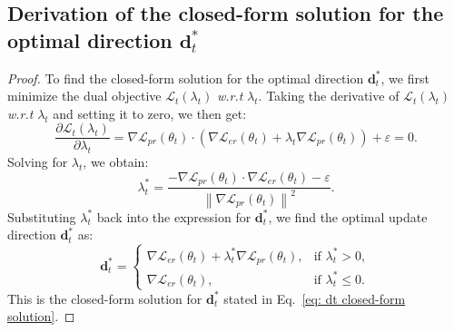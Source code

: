 \subsection{Derivation of the closed-form solution for the optimal direction $\mathbf{d}^*_t$}
\label{appendix: Derivation of the closed-form solution for the optimal direction}
\begin{proof}

To find the closed-form solution for the optimal direction $\mathbf{d}^*_t$, we first minimize the dual objective $\mathcal{L}_{t}(\lambda_t)$ \textit{w.r.t} $\lambda_t$. Taking the derivative of $\mathcal{L}_{t}(\lambda_t)$ \textit{w.r.t} $\lambda_t$ and setting it to zero, we then get:
\begin{equation}
    \label{eq: Taking the derivative of Lt wrt lambda t and setting it to zero}
    \frac{\partial \mathcal{L}_{t}(\lambda_t)}{\partial \lambda_t} = \nabla \mathcal{L}_{pr}(\theta_t) \cdot (\nabla \mathcal{L}_{er}(\theta_t) + \lambda_t \nabla \mathcal{L}_{pr}(\theta_t)) + \varepsilon = 0.
\end{equation}
Solving for $\lambda_t$, we obtain:
\begin{equation}
    \lambda_t^* = \frac{-\nabla \mathcal{L}_{pr}(\theta_t) \cdot \nabla \mathcal{L}_{er}(\theta_t) - \varepsilon}{\left\|\nabla \mathcal{L}_{pr}(\theta_t)\right\|^2}.
\end{equation}
Substituting $\lambda_t^*$ back into the expression for $\mathbf{d}^*_t$, we find the optimal update direction $\mathbf{d}^*_t$ as:
\begin{equation}
    \mathbf{d}^*_t = \begin{cases} 
\nabla \mathcal{L}_{er}(\theta_t) + \lambda^*_t \nabla \mathcal{L}_{pr}(\theta_t), & \text{if } \lambda_t^* > 0, \\
\nabla \mathcal{L}_{er}(\theta_t), & \text{if } \lambda_t^* \leq 0.
\end{cases}
\end{equation}
This is the closed-form solution for $\mathbf{d}^*_t$ stated in Eq.~\ref{eq: dt closed-form solution}.
\end{proof}


